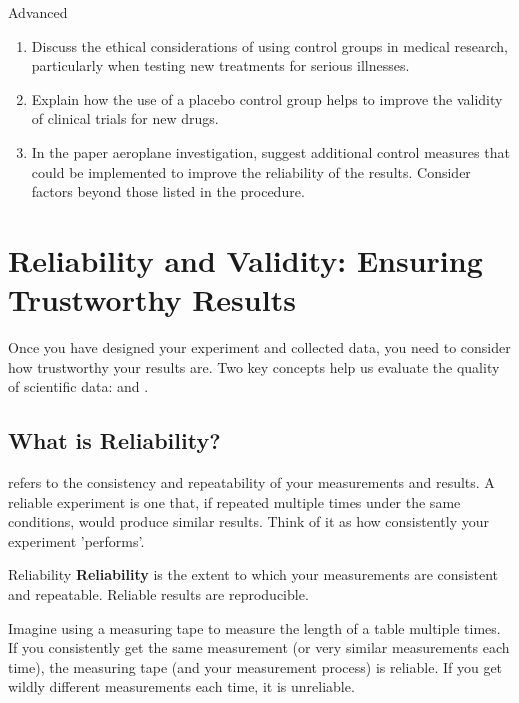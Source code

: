 \begin{tieredquestions}{Advanced}
\begin{enumerate}
    \item  Discuss the ethical considerations of using control groups in medical research, particularly when testing new treatments for serious illnesses.
    \item  Explain how the use of a placebo control group helps to improve the validity of clinical trials for new drugs. 
    \item  In the paper aeroplane investigation, suggest additional control measures that could be implemented to improve the reliability of the results.  Consider factors beyond those listed in the procedure.
\end{enumerate}
\end{tieredquestions}

\section{Reliability and Validity: Ensuring Trustworthy Results}

Once you have designed your experiment and collected data, you need to consider how trustworthy your results are.  Two key concepts help us evaluate the quality of scientific data:  and .

\subsection{What is Reliability?}

 refers to the consistency and repeatability of your measurements and results.  A reliable experiment is one that, if repeated multiple times under the same conditions, would produce similar results.  Think of it as how consistently your experiment 'performs'.

\begin{keyconcept}{Reliability}
\textbf{Reliability} is the extent to which your measurements are consistent and repeatable.  Reliable results are reproducible.
\end{keyconcept}

 Imagine using a measuring tape to measure the length of a table multiple times. If you consistently get the same measurement (or very similar measurements each time), the measuring tape (and your measurement process) is reliable. If you get wildly different measurements each time, it is unreliable.

